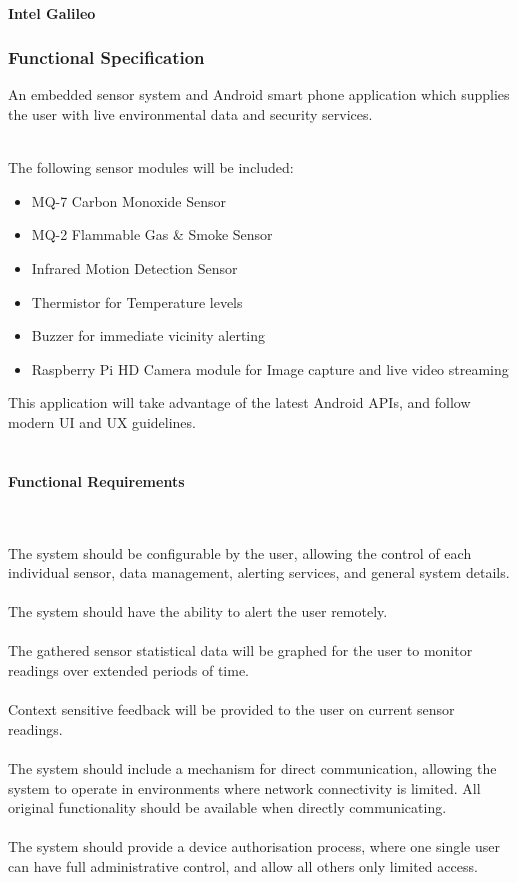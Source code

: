 \documentclass{article}
\begin{document}
\paragraph{Intel Galileo}

\subsubsection{Functional Specification}
An embedded sensor system and Android smart phone application which supplies the user with live environmental data and security services. \\\

The following sensor modules will be included:

\begin{itemize}
  \item MQ-7 Carbon Monoxide Sensor
  \item MQ-2 Flammable Gas \& Smoke Sensor
  \item Infrared Motion Detection Sensor	
  \item Thermistor for Temperature levels
  \item Buzzer for immediate vicinity alerting
  \item Raspberry Pi HD Camera module for Image capture and live video streaming 
\end{itemize}

This application will take advantage of the latest Android APIs, and follow modern UI and UX guidelines. \\\

\paragraph*{Functional Requirements}\

The system should be configurable by the user, allowing the control of each individual sensor, data management, alerting services, and general system details. \\\\ The system should have the ability to alert the user remotely.  \\\\ The gathered sensor statistical data will be graphed for the user to monitor readings over extended periods of time. \\\\ Context sensitive feedback will be provided to the user on current sensor readings. \\\\ The system should include a mechanism for direct communication, allowing the system to operate in environments where network connectivity is limited. All original functionality should be available when directly communicating. \\\\ The system should provide a device authorisation process, where one single user can have full administrative control, and allow all others only limited access.
\end{document}
